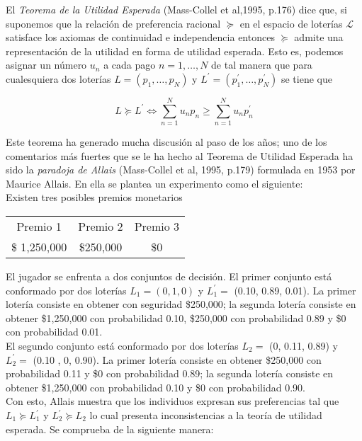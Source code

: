 El \textit{Teorema de la Utilidad Esperada} (Mass-Collel et al,1995, p.176) dice que, si suponemos que la relación de preferencia racional $\succeq$ en el espacio de loterías $\mathscr{L}$ satisface los axiomas de continuidad e independencia entonces $\succeq$ admite una representación de la utilidad en forma de utilidad esperada. Esto es, podemos asignar un número $u_n$ a cada pago $n = 1, \dots, N$ de tal manera que para cualesquiera dos loterías $L = (p_1,\dots,p_N)$ y $L^\prime = (p^{\prime}_1,\dots, p^{\prime}_N)$ se tiene que

\begin{equation}
    L \succeq L^\prime \Leftrightarrow \sum ^{N}_{n = 1} u_n p_n \geq \sum ^{N}_{n = 1} u_n p^{\prime}_n
\end{equation}

Este teorema ha generado mucha discusión al paso de los años; uno de los comentarios más fuertes que se le ha hecho al Teorema de Utilidad Esperada ha sido la \textit{paradoja de Allais} (Mass-Collel et al, 1995, p.179) formulada en 1953 por Maurice Allais. En ella se plantea un experimento como el siguiente: \\

Existen tres posibles premios monetarios

\begin{table}[H]
\centering
\begin{tabular}{ccc}
Premio 1     & Premio 2  & Premio 3 \\
\$ 1,250,000 & \$250,000 & \$0     
\end{tabular}
\end{table}

El jugador se enfrenta a dos conjuntos de decisión. El primer conjunto está conformado por dos loterías $L_1 = (0,1,0)$ y $L^{\prime}_1 =$ (0.10, 0.89, 0.01). La primer lotería consiste en obtener con seguridad \$250,000; la segunda lotería consiste en obtener \$1,250,000 con probabilidad 0.10, \$250,000 con probabilidad 0.89 y \$0 con probabilidad 0.01. \\

El segundo conjunto está conformado por dos loterías $L_2 =$ (0, 0.11, 0.89) y $L^{\prime}_2 =$ (0.10 , 0, 0.90). La primer lotería consiste en obtener \$250,000 con probabilidad 0.11 y \$0 con probabilidad 0.89; la segunda lotería consiste en obtener \$1,250,000 con probabilidad 0.10 y \$0 con probabilidad 0.90. \\

Con esto, Allais muestra que los individuos expresan sus preferencias tal que $L_1 \succeq L^{\prime}_1$ y $L^{\prime}_2 \succeq L_2$ lo cual presenta inconsistencias a la teoría de utilidad esperada. Se comprueba de la siguiente manera: \\

